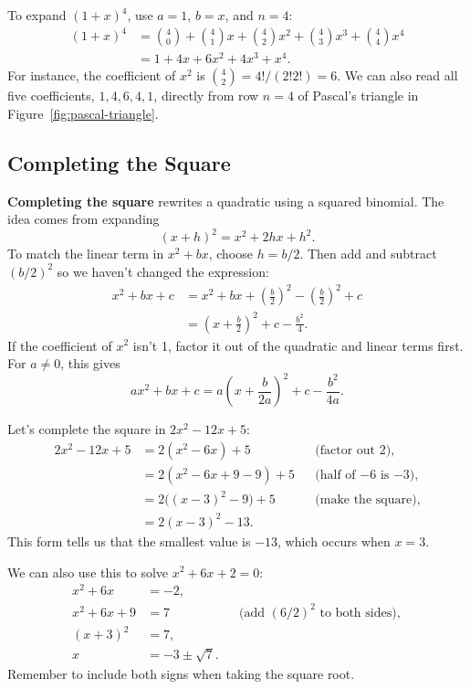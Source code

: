 \begin{exampleblock}
To expand $(1+x)^4$, use $a=1$, $b=x$, and $n=4$:
\begin{align*}
(1+x)^4
&=\binom40+\binom41x+\binom42x^2+\binom43x^3+\binom44x^4\\
&=1+4x+6x^2+4x^3+x^4.
\end{align*}
For instance, the coefficient of $x^2$ is
$\binom42=4!/(2!2!)=6$.
We can also read all five coefficients, $1,4,6,4,1$, directly from
row $n=4$ of Pascal's triangle in Figure~\ref{fig:pascal-triangle}.
\end{exampleblock}

\subsection{Completing the Square}

\textbf{Completing the square} rewrites a quadratic using a squared
binomial. The idea comes from expanding
$$(x+h)^2=x^2+2hx+h^2.$$
To match the linear term in $x^2+bx$, choose $h=b/2$. Then add and
subtract $(b/2)^2$ so we haven't changed the expression:
\begin{align*}
x^2+bx+c
&=x^2+bx+\left(\frac b2\right)^2
  -\left(\frac b2\right)^2+c\\
&=\left(x+\frac b2\right)^2+c-\frac{b^2}{4}.
\end{align*}
If the coefficient of $x^2$ isn't 1, factor it out of the quadratic
and linear terms first. For $a\ne0$, this gives
$$ax^2+bx+c
=a\left(x+\frac{b}{2a}\right)^2+c-\frac{b^2}{4a}.$$

\begin{exampleblock}
Let's complete the square in $2x^2-12x+5$:
\begin{align*}
2x^2-12x+5
&=2(x^2-6x)+5 &&\text{(factor out 2)},\\
&=2(x^2-6x+9-9)+5 &&\text{(half of $-6$ is $-3$)},\\
&=2\bigl((x-3)^2-9\bigr)+5 &&\text{(make the square)},\\
&=2(x-3)^2-13.
\end{align*}
This form tells us that the smallest value is $-13$, which occurs
when $x=3$.
\end{exampleblock}

\begin{exampleblock}
We can also use this to solve $x^2+6x+2=0$:
\begin{align*}
x^2+6x&=-2,\\
x^2+6x+9&=7 &&\text{(add $(6/2)^2$ to both sides)},\\
(x+3)^2&=7,\\
x&=-3\pm\sqrt7.
\end{align*}
Remember to include both signs when taking the square root.
\end{exampleblock}
